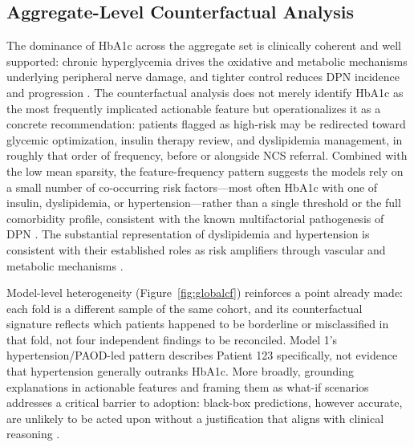 \documentclass[pdflatex,sn-mathphys-num]{sn-jnl}%
\theoremstyle{thmstyleone}%
\theoremstyle{thmstyletwo}%
\theoremstyle{thmstylethree}%
\begin{document}
\subsection{Aggregate-Level Counterfactual Analysis}
\label{sec:aggregate-cf}
The dominance of HbA1c across the aggregate set is clinically coherent and well supported: chronic
hyperglycemia drives the oxidative and metabolic mechanisms underlying peripheral nerve damage, and
tighter control reduces DPN incidence and progression \cite{callaghan2012,tesfaye2010diabetic}. The
counterfactual analysis does not merely identify HbA1c as the most frequently implicated actionable
feature but operationalizes it as a concrete recommendation: patients flagged as high-risk may be
redirected toward glycemic optimization, insulin therapy review, and dyslipidemia management, in
roughly that order of frequency, before or alongside NCS referral. Combined with the low mean
sparsity, the feature-frequency pattern suggests the models rely on a small number of co-occurring
risk factors---most often HbA1c with one of insulin, dyslipidemia, or hypertension---rather than a
single threshold or the full comorbidity profile, consistent with the known multifactorial
pathogenesis of DPN \cite{feldman2019}. The substantial representation of dyslipidemia and
hypertension is consistent with their established roles as risk amplifiers through vascular and
metabolic mechanisms \cite{jaiswal2017,callaghan2012}.

Model-level heterogeneity (Figure~\ref{fig:globalcf}) reinforces a point already made: each fold is a
different sample of the same cohort, and its counterfactual signature reflects which patients happened
to be borderline or misclassified in that fold, not four independent findings to be reconciled. Model
1's hypertension/PAOD-led pattern describes Patient 123 specifically, not evidence that hypertension
generally outranks HbA1c. More broadly, grounding explanations in actionable features and framing them
as what-if scenarios addresses a critical barrier to adoption: black-box predictions, however accurate,
are unlikely to be acted upon without a justification that aligns with clinical reasoning
\cite{rudin2019}.
\end{document}
